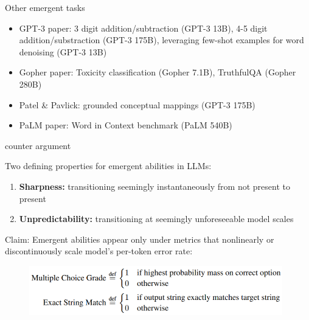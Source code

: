 
\begin{vbframe}{Other emergent tasks}

\vfill

\begin{itemize}
    \item GPT-3 paper: 3 digit addition/subtraction (GPT-3 13B), 4-5 digit addition/substraction (GPT-3 175B), leveraging few-shot examples for word denoising (GPT-3 13B)
    \item Gopher paper: Toxicity classification (Gopher 7.1B), TruthfulQA (Gopher 280B)
    \item Patel \& Pavlick: grounded conceptual mappings (GPT-3 175B)
    \item PaLM paper: Word in Context benchmark (PaLM 540B)
\end{itemize}

\vfill

\end{vbframe}







\begin{vbframe}{counter argument}


\vfill

Two defining properties for emergent abilities in LLMs:

\begin{enumerate}
%
\item \textbf{Sharpness:} transitioning seemingly instantaneously from not present to present
%
\item \textbf{Unpredictability:} transitioning at seemingly unforeseeable model scales
%
\end{enumerate}

\vskip5mm

Claim: Emergent abilities appear only under metrics that nonlinearly or discontinuously scale model's per-token error rate:

	\begin{figure}
		\centering
		\includegraphics[width = 11cm]{figure/metrics.png} \\ 
	\end{figure}

\vfill

\end{vbframe}


